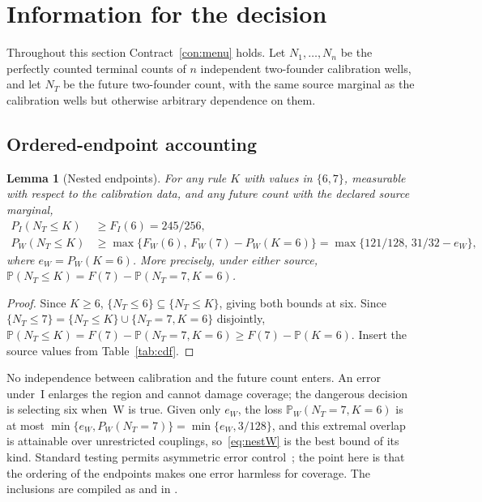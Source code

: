 \documentclass[11pt,a4paper]{article}
\theoremstyle{plain}
\newtheorem{lemma}[theorem]{Lemma}
\theoremstyle{definition}
\theoremstyle{remark}
\newcommand{\PP}{\mathbb P}
\begin{document}
\section{Information for the decision}\label{sec:decision}

Throughout this section Contract~\ref{con:menu} holds. Let $N_1,\dots,N_n$ be the perfectly counted terminal counts of $n$ independent two-founder calibration wells, and let $N_T$ be the future two-founder count, with the same source marginal as the calibration wells but otherwise arbitrary dependence on them.

\subsection{Ordered-endpoint accounting}
\begin{lemma}[Nested endpoints]\label{lem:nested}
For any rule $K$ with values in $\{6,7\}$, measurable with respect to the calibration data, and any future count with the declared source marginal,
\begin{align}
P_I(N_T\le K)&\ge F_I(6)=245/256,\label{eq:nestI}\\
P_W(N_T\le K)&\ge\max\{F_W(6),\,F_W(7)-P_W(K=6)\}=\max\{121/128,\,31/32-e_W\},\label{eq:nestW}
\end{align}
where $e_W=P_W(K=6)$. More precisely, under either source, $\PP(N_T\le K)=F(7)-\PP(N_T=7,K=6)$.
\end{lemma}

\begin{proof}
Since $K\ge6$, $\{N_T\le6\}\subseteq\{N_T\le K\}$, giving both bounds at six. Since $\{N_T\le7\}=\{N_T\le K\}\cup\{N_T=7,K=6\}$ disjointly, $\PP(N_T\le K)=F(7)-\PP(N_T=7,K=6)\ge F(7)-\PP(K=6)$. Insert the source values from Table~\ref{tab:cdf}.
\end{proof}

No independence between calibration and the future count enters. An error under~I enlarges the region and cannot damage coverage; the dangerous decision is selecting six when~W is true. Given only $e_W$, the loss $\PP_W(N_T=7,K=6)$ is at most $\min\{e_W,P_W(N_T=7)\}=\min\{e_W,3/128\}$, and this extremal overlap is attainable over unrestricted couplings, so~\eqref{eq:nestW} is the best bound of its kind. Standard testing permits asymmetric error control~\citep{lehmannromano2005}; the point here is that the ordering of the endpoints makes one error harmless for coverage. The inclusions are compiled as  and  in .
\end{document}
